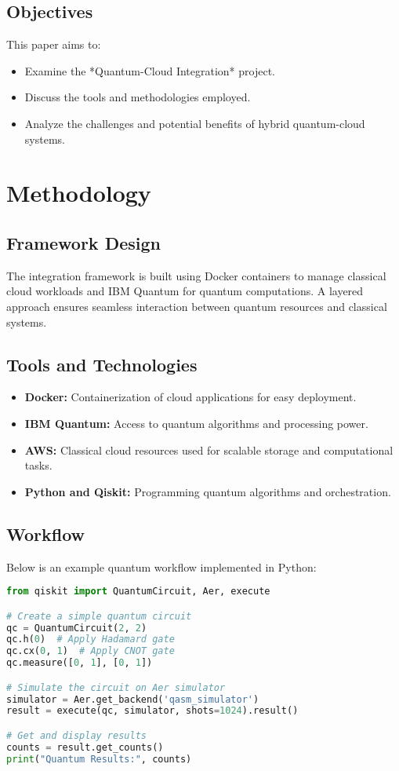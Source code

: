 \documentclass[12pt,a4paper]{article}
\begin{document}
\subsection{Objectives}
This paper aims to:
\begin{itemize}
    \item Examine the *Quantum-Cloud Integration* project.
    \item Discuss the tools and methodologies employed.
    \item Analyze the challenges and potential benefits of hybrid quantum-cloud systems.
\end{itemize}

\section{Methodology}
\subsection{Framework Design}
The integration framework is built using Docker containers to manage classical cloud workloads and IBM Quantum for quantum computations. A layered approach ensures seamless interaction between quantum resources and classical systems.

\subsection{Tools and Technologies}
\begin{itemize}
    \item \textbf{Docker:} Containerization of cloud applications for easy deployment.
    \item \textbf{IBM Quantum:} Access to quantum algorithms and processing power.
    \item \textbf{AWS:} Classical cloud resources used for scalable storage and computational tasks.
    \item \textbf{Python and Qiskit:} Programming quantum algorithms and orchestration.
\end{itemize}

\subsection{Workflow}
Below is an example quantum workflow implemented in Python:

\begin{tcolorbox}[title=Quantum Circuit Example, colback=gray!5!white, colframe=blue!75!black]
\begin{lstlisting}[language=Python]
from qiskit import QuantumCircuit, Aer, execute

# Create a simple quantum circuit
qc = QuantumCircuit(2, 2)
qc.h(0)  # Apply Hadamard gate
qc.cx(0, 1)  # Apply CNOT gate
qc.measure([0, 1], [0, 1])

# Simulate the circuit on Aer simulator
simulator = Aer.get_backend('qasm_simulator')
result = execute(qc, simulator, shots=1024).result()

# Get and display results
counts = result.get_counts()
print("Quantum Results:", counts)
\end{lstlisting}
\end{tcolorbox}
\end{document}
